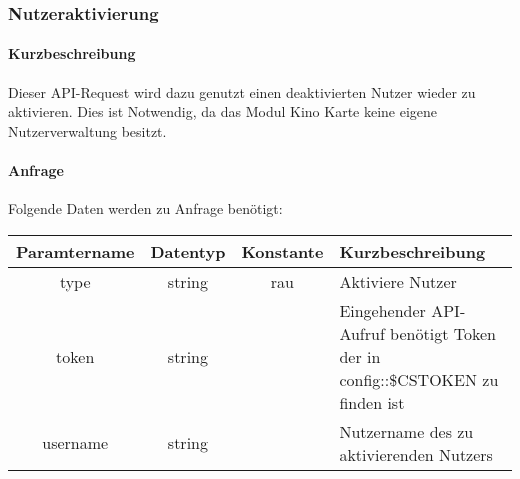 \subsubsection{Nutzeraktivierung}
\paragraph{Kurzbeschreibung}Dieser API-Request wird dazu genutzt einen deaktivierten Nutzer wieder zu aktivieren. Dies ist Notwendig, da das Modul {\glqq Kino Karte\grqq} keine eigene Nutzerverwaltung besitzt.
\paragraph{Anfrage}Folgende Daten werden zu Anfrage benötigt:
\begin{table}[H]
	\begin{tabular}{|c|c|c|p{6.5cm}|}
		\hline
		\textbf{Paramtername} & \textbf{Datentyp} & \textbf{Konstante} & \textbf{Kurzbeschreibung}                                                                                               \\ \hline
		type                & string            & rau                & Aktiviere Nutzer                                                                                                      \\ \hline
		token               & string            &                    & Eingehender API-Aufruf benötigt Token der in config::\$CSTOKEN zu finden ist \\ \hline
		username            & string            &                    & Nutzername des zu aktivierenden Nutzers                                                                               \\ \hline
	\end{tabular}
\end{table}
